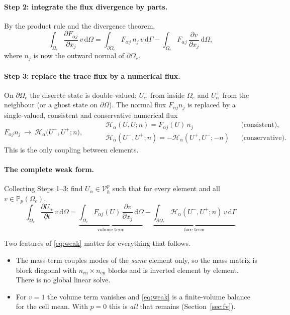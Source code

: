 \documentclass[11pt,a4paper]{article}
\theoremstyle{remark}
\theoremstyle{definition}
\newcommand{\dd}{\,\mathrm{d}}
\newcommand{\Hf}{\mathcal{H}}
\begin{document}
\paragraph{Step 2: integrate the flux divergence by parts.} By the product rule and the divergence theorem,
\begin{equation}\label{eq:w2}
\int_{\Omega_e}\frac{\partial F_{\alpha j}}{\partial x_j}\,v\dd\Omega=\int_{\partial\Omega_e}F_{\alpha j}\,n_j\,v\dd\Gamma-\int_{\Omega_e}F_{\alpha j}\,\frac{\partial v}{\partial x_j}\dd\Omega,
\end{equation}
where $n_j$ is now the outward normal of $\partial\Omega_e$.

\paragraph{Step 3: replace the trace flux by a numerical flux.} On $\partial\Omega_e$ the discrete state is double-valued: $U^-_\alpha$ from inside $\Omega_e$ and $U^+_\alpha$ from the neighbour (or a ghost state on $\partial\Omega$). The normal flux $F_{\alpha j}n_j$ is replaced by a single-valued, consistent and conservative numerical flux
\begin{equation}\label{eq:numflux}
F_{\alpha j}n_j\ \longrightarrow\ \Hf_\alpha\big(U^-,U^+;n\big),\qquad
\begin{aligned}
&\Hf_\alpha(U,U;n)=F_{\alpha j}(U)\,n_j &&\text{(consistent)},\\
&\Hf_\alpha(U^-,U^+;n)=-\Hf_\alpha(U^+,U^-;-n) &&\text{(conservative)}.
\end{aligned}
\end{equation}
This is the only coupling between elements.

\paragraph{The complete weak form.} Collecting Steps 1--3: find $U_\alpha\in\mathcal{V}_h^p$ such that for every element and all $v\in\mathbb{P}_p(\Omega_e)$,
\begin{equation}\label{eq:weak}
\boxed{\ \int_{\Omega_e}\frac{\partial U_\alpha}{\partial t}\,v\dd\Omega=\underbrace{\int_{\Omega_e}F_{\alpha j}(U)\,\frac{\partial v}{\partial x_j}\dd\Omega}_{\text{volume term}}-\underbrace{\int_{\partial\Omega_e}\Hf_\alpha(U^-,U^+;n)\,v\dd\Gamma}_{\text{face term}}\ }
\end{equation}

Two features of \eqref{eq:weak} matter for everything that follows.
\begin{itemize}
\item The mass term couples modes of the \emph{same} element only, so the mass matrix is block diagonal with $n_{\mathrm{en}}\times n_{\mathrm{en}}$ blocks and is inverted element by element. There is no global linear solve.
\item For $v=1$ the volume term vanishes and \eqref{eq:weak} is a finite-volume balance for the cell mean. With $p=0$ this is \emph{all} that remains (Section~\ref{sec:fv}).
\end{itemize}
\end{document}

